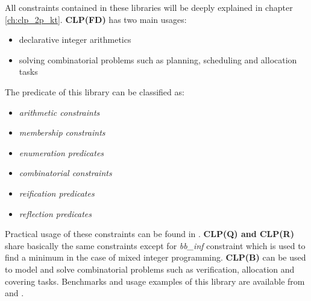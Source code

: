 All constraints contained in these libraries will be deeply explained
in chapter \ref{ch:clp_2p_kt}.\newline\newline
\textbf{CLP(FD)} has two main usages:
\begin{itemize}
    \item declarative integer arithmetics
    \item solving combinatorial problems such as planning, scheduling and allocation tasks
\end{itemize}
The predicate of this library can be classified as:
\begin{itemize}
    \item \textit{arithmetic constraints}
    \item \textit{membership constraints}
    \item \textit{enumeration predicates}
    \item \textit{combinatorial constraints}
    \item \textit{reification predicates}
    \item \textit{reflection predicates}
\end{itemize}

Practical usage of these constraints can be found in \cite{Triska12}.\newline\newline
\textbf{CLP(Q) and CLP(R)} share basically the same constraints except for \textit{bb\_inf}
constraint which is used to find a minimum in the case of mixed integer programming.\newline\newline
\textbf{CLP(B)} can be used to model and solve combinatorial problems such as verification, allocation and covering tasks.
Benchmarks and usage examples of this library are available from \cite{Triska2016} and \cite{Triska2018}.
